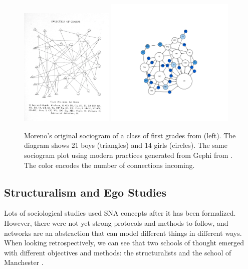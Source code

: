 \begin{figure}
    \centering %
    \includegraphics[width=0.4\textwidth]{static/figures/RelatedWork/Moreno-1}
    \includegraphics[width=0.55\textwidth]{static/figures/RelatedWork/Moreno-1_GrandJean}
    \caption{Moreno's original sociogram of a class of first grades from \cite{morenoWhoShallSurvive1934} (left). The diagram shows 21 boys (triangles) and 14 girls (circles). The same sociogram plot using modern practices generated from Gephi from \cite{grandjeanSocialNetworkAnalysis2015}. The color encodes the number of connections incoming.}
    \label{fig:moreno-sociogram}
\end{figure}



\subsection{Structuralism and Ego Studies}

Lots of sociological studies used SNA concepts after it has been formalized.
However, there were not yet strong protocols and methods to follow, and networks are an abstraction that can model different things in different ways.
When looking retrospectively, we can see that two schools of thought emerged with different objectives and methods: the structuralists and the school of Manchester \cite{eveDeuxTraditionsAnalyse2002, maurizio2000, freemanDevelopmentSocialNetwork2004}.


